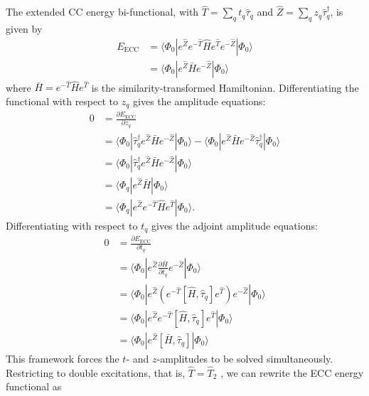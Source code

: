 The extended CC energy bi-functional, with $\hat{T} = \sum_q t_q \hat{\tau}_q$ and $\hat{Z} = \sum_q z_q \hat{\tau}_q^\dag$, is given by
\begin{align}
	E_{\text{ECC}} &= \langle\Phi_0| e^{\hat{Z}} e^{-\hat{T}} \hat{H} e^{\hat{T}} e^{-\hat{Z}} |\Phi_0\rangle \\
	&= \langle\Phi_0| e^{\hat{Z}} \bar{H} e^{-\hat{Z}} |\Phi_0\rangle
\end{align}
where $\bar{H} = e^{-\hat{T}} \hat{H} e^{\hat{T}}$ is the similarity-transformed Hamiltonian. Differentiating the functional with respect to $z_q$ gives the amplitude equations:
\begin{align}
 0&=	\frac{\partial E_{\text{ECC}}}{\partial z_q} \\
&=\langle\Phi_0| \hat{\tau}_q^\dag e^{\hat{Z}} \bar{H} e^{-\hat{Z}} |\Phi_0\rangle - \langle\Phi_0| e^{\hat{Z}} \bar{H} e^{-\hat{Z}} \hat{\tau}_q^\dag |\Phi_0\rangle \\
 &=\langle\Phi_0| \hat{\tau}_q^\dag e^{\hat{Z}} \bar{H} e^{-\hat{Z}} |\Phi_0\rangle  \\
&=\langle\Phi_q| e^{\hat{Z}} \bar{H} |\Phi_0\rangle \label{eq:ECC_right_amp_eqn} \\
&=\langle\Phi_q| e^{\hat{Z}} e^{-\hat{T}} \hat{H} e^{\hat{T}} |\Phi_0\rangle.
\end{align}
Differentiating with respect to $t_q$ gives the adjoint amplitude equations:
\begin{align}
0&=	\frac{\partial E_{\text{ECC}}}{\partial t_q} \\
&=\langle\Phi_0| e^{\hat{Z}} \frac{\partial \bar{H}}{\partial t_q} e^{-\hat{Z}} |\Phi_0\rangle \\
&=\langle\Phi_0| e^{\hat{Z}} \left(e^{-\hat{T}} [\hat{H}, \hat{\tau}_q] e^{\hat{T}}\right) e^{-\hat{Z}} |\Phi_0\rangle \\
&=\langle\Phi_0| e^{\hat{Z}} e^{-\hat{T}} [\hat{H}, \hat{\tau}_q] e^{\hat{T}} |\Phi_0\rangle \\
&=\langle\Phi_0| e^{\hat{Z}} [\bar{H}, \hat{\tau}_q] |\Phi_0\rangle \label{eq:ECC_left_amp_eqn}
\end{align}
This framework forces the $t$- and $z$-amplitudes to be solved simultaneously. Restricting to double excitations, that is, $\hat{T} = \hat{T}_2$
, we can rewrite the ECC energy functional as
